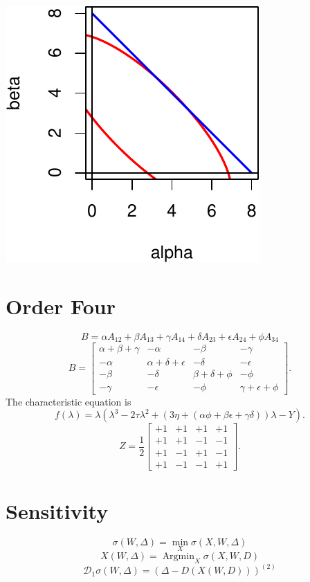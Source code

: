\documentclass[
  12pt,
  letterpaper,
  DIV=11,
  numbers=noendperiod]{scrreprt}
\theoremstyle{remark}
\begin{document}
\includegraphics{inverse_files/figure-pdf/unnamed-chunk-3-4.pdf}

\section{Order Four}\label{order-four}

\[
B=\alpha A_{12}+\beta A_{13}+\gamma A_{14}+\delta A_{23}+\epsilon A_{24}+\phi A_{34}
\] \[
B=\begin{bmatrix}
\alpha+\beta+\gamma&-\alpha&-\beta&-\gamma\\
-\alpha&\alpha+\delta+\epsilon&-\delta&-\epsilon\\
-\beta&-\delta&\beta+\delta+\phi&-\phi\\
-\gamma&-\epsilon&-\phi&\gamma+\epsilon+\phi
\end{bmatrix}.
\] The characteristic equation is \[
f(\lambda)=\lambda(\lambda^3-2\tau\lambda^2+(3\eta+(\alpha\phi+\beta\epsilon+\gamma\delta))\lambda-Y).
\] \[
Z=\frac12\begin{bmatrix}
+1&+1&+1&+1\\
+1&+1&-1&-1\\
+1&-1&+1&-1\\
+1&-1&-1&+1
\end{bmatrix}.
\]

\section{Sensitivity}\label{sensitivity}

\[
\sigma(W,\Delta)=\min_X\sigma(X,W,\Delta)
\] \[
X(W,\Delta)=\mathop{\text{Argmin}}_X\sigma(X,W,D)
\] \[
\mathcal{D}_1\sigma(W,\Delta)=(\Delta-D(X(W,D)))^{(2)}
\]
\end{document}
